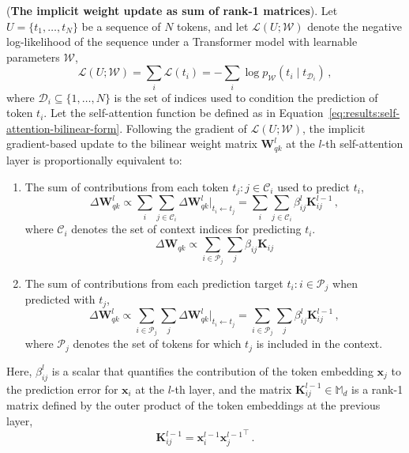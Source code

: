 \begin{proposition}
\label{prop-gradients-self-attention}
%
(\textbf{The implicit weight update as sum of rank-1 matrices}).
%
Let \( U = \{t_1, \dots, t_N\} \) be a sequence of \( N \) tokens, and let \( \mathcal{L}(U; \mathcal{W}) \) denote the negative log-likelihood of the sequence under a Transformer model with learnable parameters \( \mathcal{W} \),
%
\begin{equation}
    \mathcal{L}(U; \mathcal{W}) = \sum_i \mathcal{L}(t_i) = - \sum_i \log p_{\mathcal{W}}(t_i \mid t_{\mathcal{D}_i})\,,
\end{equation}
%
where \( \mathcal{D}_i \subseteq \{1, \dots, N\} \) is the set of indices used to condition the prediction of token \( t_i \).
%
Let the self-attention function be defined as in Equation~\eqref{eq:results:self-attention-bilinear-form}.
%
Following the gradient of \( \mathcal{L}(U; \mathcal{W}) \), the implicit gradient-based update to the bilinear weight matrix \( \bm{W}_{qk}^l \) at the \( l \)-th self-attention layer is proportionally equivalent to:

\begin{enumerate}[noitemsep]
    \item 
    The sum of contributions from each token \( t_j: j  \in \mathcal{C}_i \) used to predict \( t_i \),
    \begin{equation}
    \label{eq:weight-update-bilinear-form}
    \Delta \bm{W}_{qk}^l \propto \sum_i \sum_{j \in \mathcal{C}_i} \Delta \bm{W}_{qk}^l\Big|_{t_i \leftarrow t_j} = \sum_i \sum_{j \in \mathcal{C}_i} \beta^l_{ij} \bm{K}^{l-1}_{ij}\,,
    \end{equation}
    where \( \mathcal{C}_i \) denotes the set of context indices for predicting \( t_i \).
%
\[
\Delta \mathbf{W}_{qk} \propto \sum_{i \in \mathcal{P}_j} \sum_{j} \beta_{ij} \mathbf{K}_{ij}
\]
    \item
    The sum of contributions from each prediction target \( t_i: i \in \mathcal{P}_j \) when predicted with \( t_j \),
    \begin{equation}
    \label{eq:weight-update-bilinear-form-prediction}
    \Delta \bm{W}_{qk}^l \propto \sum_{i \in \mathcal{P}_j} \sum_j \Delta \bm{W}_{qk}^l\Big|_{t_i \leftarrow t_j} = \sum_{i \in \mathcal{P}_j} \sum_j \beta^l_{ij} \bm{K}^{l-1}_{ij}\,,
    \end{equation}
    where \( \mathcal{P}_j \) denotes the set of tokens for which \( t_j \) is included in the context.
\end{enumerate}
%
Here, \( \beta^l_{ij} \) is a scalar that quantifies the contribution of the token embedding \( \bm{x}_j \) to the prediction error for \( \bm{x}_i \) at the \( l \)-th layer, and the matrix \( \bm{K}^{l-1}_{ij} \in \mathbb{M}_d \) is a rank-1 matrix defined by the outer product of the token embeddings at the previous layer,
%
\begin{equation}
    \bm{K}^{l-1}_{ij} = \bm{x}^{l-1}_i {\bm{x}^{l-1}_j}^\top\,.
\end{equation}
%
\end{proposition}